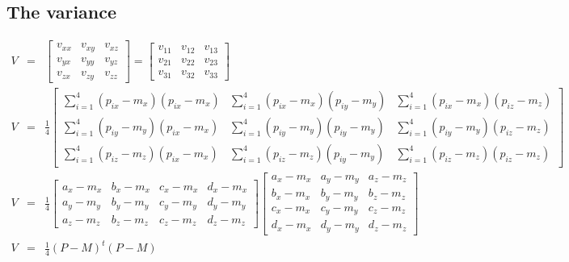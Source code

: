 \documentclass{article}
\begin{document}
\subsection{The variance}

\[
\begin{array}{lcl}
V & = &
\left[\begin{array}{ccc}
 v_{xx} & v_{xy} & v_{xz} \\
 v_{yx} & v_{yy} & v_{yz} \\
 v_{zx} & v_{zy} & v_{zz}
\end{array}\right]
=
\left[\begin{array}{ccc}
 v_{11} & v_{12} & v_{13} \\
 v_{21} & v_{22} & v_{23} \\
 v_{31} & v_{32} & v_{33}
\end{array}\right]
\\
V & = &
\frac{1}{4}
\left[\begin{array}{ccc}
 \sum_{i=1}^4 (p_{ix} - m_x)(p_{ix} - m_x) &
  \sum_{i=1}^4 (p_{ix} - m_x)(p_{iy} - m_y) &
  \sum_{i=1}^4 (p_{ix} - m_x)(p_{iz} - m_z) \\
 \sum_{i=1}^4 (p_{iy} - m_y)(p_{ix} - m_x) &
  \sum_{i=1}^4 (p_{iy} - m_y)(p_{iy} - m_y) &
  \sum_{i=1}^4 (p_{iy} - m_y)(p_{iz} - m_z) \\
 \sum_{i=1}^4 (p_{iz} - m_z)(p_{ix} - m_x) &
  \sum_{i=1}^4 (p_{iz} - m_z)(p_{iy} - m_y) &
  \sum_{i=1}^4 (p_{iz} - m_z)(p_{iz} - m_z)
\end{array}\right]
\\
V & = &
\frac{1}{4}
\left[\begin{array}{cccc}
 a_x - m_x & b_x - m_x & c_x - m_x & d_x - m_x \\
 a_y - m_y & b_y - m_y & c_y - m_y & d_y - m_y \\
 a_z - m_z & b_z - m_z & c_z - m_z & d_z - m_z
\end{array}\right]
\left[\begin{array}{ccc}
 a_x - m_x & a_y - m_y & a_z - m_z \\
 b_x - m_x & b_y - m_y & b_z - m_z \\
 c_x - m_x & c_y - m_y & c_z - m_z \\
 d_x - m_x & d_y - m_y & d_z - m_z
\end{array}\right]
\\
V & = &
\frac{1}{4}
(P - M)^t (P - M)
\end{array}
\]
\end{document}
